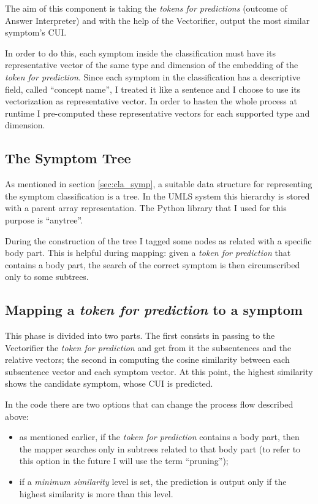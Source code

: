 The aim of this component is taking the \textit{tokens for predictions} (outcome of Answer Interpreter) and with the help of the Vectorifier, output the most similar symptom's CUI.

In order to do this, each symptom inside the classification must have its representative vector of the same type and dimension of the embedding of the \textit{token for prediction}. Since each symptom in the classification has a descriptive field, called ``concept name'', I treated it like a sentence and I choose to use its vectorization as representative vector. In order to hasten the whole process at runtime I pre-computed these representative vectors for each supported type and dimension.

\subsection{The Symptom Tree}
As mentioned in section \ref{sec:cla_symp}, a suitable data structure for representing the symptom classification is a tree. In the UMLS system this hierarchy is stored with a parent array representation. The Python library that I used for this purpose is ``anytree''.

During the construction of the tree I tagged some nodes as related with a specific body part. This is helpful during mapping: given a \textit{token for prediction} that contains a body part, the search of the correct symptom is then circumscribed only to some subtrees.

\subsection{Mapping a \textit{token for prediction} to a symptom}
This phase is divided into two parts. The first consists in passing to the Vectorifier the \textit{token for prediction} and get from it the subsentences and the relative vectors; the second in computing the cosine similarity between each subsentence vector and each symptom vector. At this point, the highest similarity shows the candidate symptom, whose CUI is predicted.

In the code there are two options that can change the process flow described above:
\begin{itemize}
  \item as mentioned earlier, if the \textit{token for prediction} contains a body part, then the mapper searches only in subtrees related to that body part (to refer to this option in the future I will use the term ``pruning'');
  \item if a \textit{minimum similarity} level is set, the prediction is output only if the highest similarity is more than this level. 
\end{itemize}
